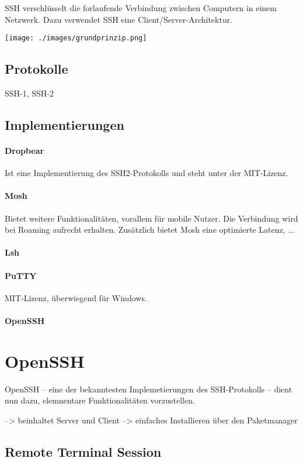 \documentclass[ngerman,pdf]{wkcms}    %
\begin{document}
SSH verschlüsselt die forlaufende Verbindung zwischen Computern in einem Netzwerk. Dazu verwendet SSH eine Client/Server-Architektur. 

\texttt{[image: ./images/grundprinzip.png]}


\subsection{Protokolle}
SSH-1, SSH-2

\subsection{Implementierungen}

\paragraph{Dropbear} Ist eine Implementierung des SSH2-Protokolls und steht unter der MIT-Lizenz.
\paragraph{Mosh} Bietet weitere Funktionalitäten, vorallem für mobile Nutzer. Die Verbindung wird bei Roaming aufrecht erhalten. Zusätzlich bietet Mosh eine optimierte Latenz, \Dh ...
\paragraph{Lsh}
\paragraph{PuTTY} MIT-Lizenz, überwiegend für Windows.
\paragraph{OpenSSH}

\section{OpenSSH}

OpenSSH -- eine der bekanntesten Implemetierungen des SSH-Protokolls -- dient nun dazu,
elemnentare Funktionalitäten vorzustellen. 

--> beinhaltet Server und Client
--> einfaches Installieren über den Paketmanager

\subsection{Remote Terminal Session}
\end{document}
